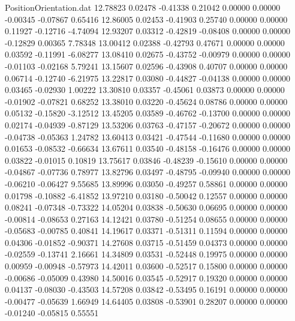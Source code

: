 \begin{filecontents}{PositionOrientation.dat}
  12.78823    0.02478   -0.41338     0.21042    0.00000    0.00000   -0.00345   -0.07867    0.65416
  12.86005    0.02453   -0.41903     0.25740    0.00000    0.00000    0.11927   -0.12716   -4.74094
  12.93207    0.03312   -0.42819    -0.08408    0.00000    0.00000   -0.12829    0.00365    7.78348
  13.00412    0.02388   -0.42793     0.47671    0.00000    0.00000    0.03592   -0.11991   -6.08277
  13.08410    0.02675   -0.43752    -0.00979    0.00000    0.00000   -0.01103   -0.02168    5.79241
  13.15607    0.02596   -0.43908     0.40707    0.00000    0.00000    0.06714   -0.12740   -6.21975
  13.22817    0.03080   -0.44827    -0.04138    0.00000    0.00000    0.03465   -0.02930    1.00222
  13.30810    0.03357   -0.45061     0.03873    0.00000    0.00000   -0.01902   -0.07821    0.68252
  13.38010    0.03220   -0.45624     0.08786    0.00000    0.00000    0.05132   -0.15820   -3.12512
  13.45205    0.03589   -0.46762    -0.13700    0.00000    0.00000    0.02174   -0.04939   -0.87129
  13.53206    0.03763   -0.47157    -0.20672    0.00000    0.00000   -0.04738   -0.05363    1.24782
  13.60413    0.03421   -0.47544    -0.11680    0.00000    0.00000    0.01653   -0.08532   -0.66634
  13.67611    0.03540   -0.48158    -0.16476    0.00000    0.00000    0.03822   -0.01015    0.10819
  13.75617    0.03846   -0.48239    -0.15610    0.00000    0.00000   -0.04867   -0.07736    0.78977
  13.82796    0.03497   -0.48795    -0.09940    0.00000    0.00000   -0.06210   -0.06427    9.55685
  13.89996    0.03050   -0.49257     0.58861    0.00000    0.00000    0.01798   -0.10882   -6.41852
  13.97210    0.03180   -0.50042     0.12557    0.00000    0.00000    0.08241   -0.07348   -0.73322
  14.05204    0.03838   -0.50630     0.06695    0.00000    0.00000   -0.00814   -0.08653    0.27163
  14.12421    0.03780   -0.51254     0.08655    0.00000    0.00000   -0.05683   -0.00785    0.40841
  14.19617    0.03371   -0.51311     0.11594    0.00000    0.00000    0.04306   -0.01852   -0.90371
  14.27608    0.03715   -0.51459     0.04373    0.00000    0.00000   -0.02559   -0.13741    2.16661
  14.34809    0.03531   -0.52448     0.19975    0.00000    0.00000    0.00959   -0.00948   -0.57973
  14.42011    0.03600   -0.52517     0.15800    0.00000    0.00000   -0.00686   -0.05009    0.43980
  14.50016    0.03545   -0.52917     0.19320    0.00000    0.00000    0.04137   -0.08030   -0.43503
  14.57208    0.03842   -0.53495     0.16191    0.00000    0.00000   -0.00477   -0.05639    1.66949
  14.64405    0.03808   -0.53901     0.28207    0.00000    0.00000   -0.01240   -0.05815    0.55551

\end{filecontents}
